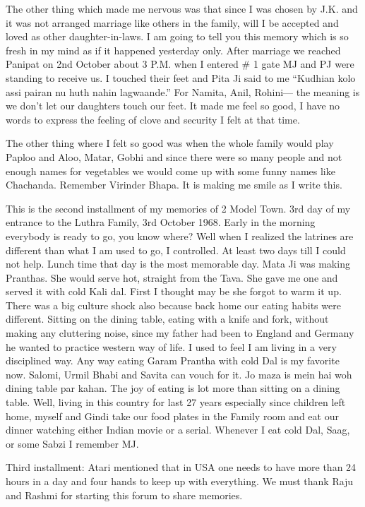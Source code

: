 The other thing which made me nervous was that since I was chosen by J.K. and it was not arranged marriage like others in the family, will I be accepted and loved as other daughter-in-laws. I am going to tell you this memory which is so fresh in my mind as if it happened yesterday only. After marriage we reached Panipat on 2nd October about 3 P.M. when I entered # 1 gate MJ and PJ were standing to receive us. I touched their feet and Pita Ji said to me “Kudhian kolo assi pairan nu huth nahin lagwaande.” For Namita, Anil, Rohini— the meaning is we don’t let our daughters touch our feet. 
It made me feel so good, I have no words to express the feeling of clove and security I felt at that time. 

The other thing where I felt so good was when the whole family would play Paploo and Aloo, Matar, Gobhi and since there were so many people and not enough names for vegetables we would come up with some funny names like Chachanda. Remember Virinder Bhapa. It is making me smile as I write this. 

This is the second installment of my memories of 2 Model Town. 3rd day of my entrance to the Luthra Family, 3rd October 1968. Early in the morning everybody is ready to go, you know where? Well when I realized the latrines are different than what I am used to go, I controlled. At least two days till I could not help. 
Lunch time that day is the most memorable day. Mata Ji was making Pranthas. She would serve hot, straight from the Tava. She gave me one and served it with cold Kali dal. First I thought may be she forgot to warm it up. There was a big culture shock also because back home our eating habits were different. Sitting on the dining table, eating with a knife and fork, without making any cluttering noise, since my father had been to England and Germany he wanted to practice western way of life. I used to feel I am living in a very disciplined way. Any way eating Garam Prantha with cold Dal is my favorite now. Salomi, Urmil Bhabi and Savita can vouch for it. Jo maza is mein hai woh dining table par kahan. 
The joy of eating is lot more than sitting on a dining table. Well, living in this country for last 27 years especially since children left home, myself and Gindi take our food plates in the Family room and eat our dinner watching either Indian movie or a serial.
Whenever I eat cold Dal, Saag, or some Sabzi I remember MJ. 

Third installment:
Atari mentioned that in USA one needs to have more than 24 hours in a day and four hands to keep up with everything. We must thank Raju and Rashmi for starting this forum to share memories. 


